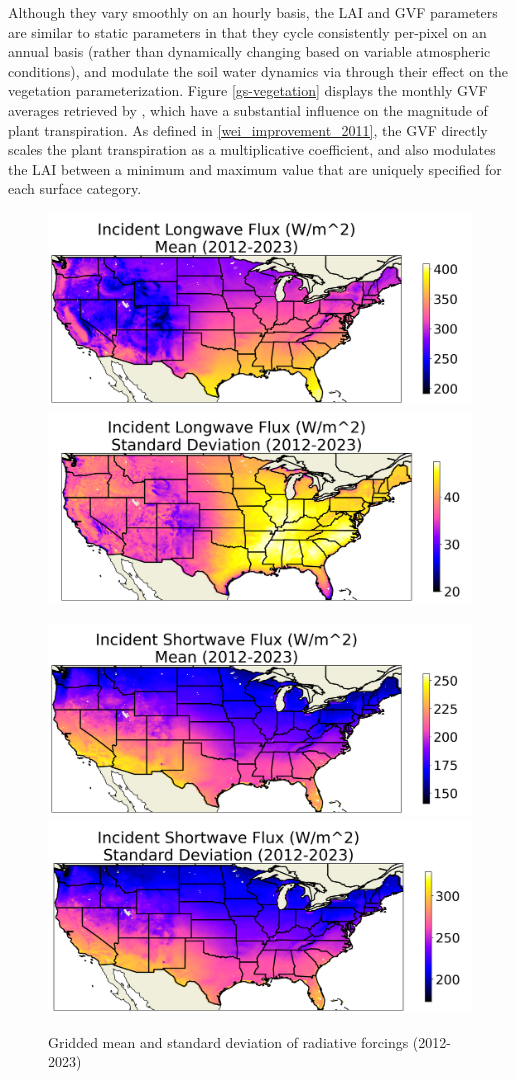 Although they vary smoothly on an hourly basis, the LAI and GVF parameters are similar to static parameters in that they cycle consistently per-pixel on an annual basis (rather than dynamically changing based on variable atmospheric conditions), and modulate the soil water dynamics via through their effect on the vegetation parameterization. Figure \ref{gs-vegetation} displays the monthly GVF averages retrieved by \citep{gutman_derivation_1998}, which have a substantial influence on the magnitude of plant transpiration. As defined in \ref{wei_improvement_2011}, the GVF directly scales the plant transpiration as a multiplicative coefficient, and also modulates the LAI between a minimum and maximum value that are uniquely specified for each surface category.

\begin{figure}[h!]
    \centering
    \includegraphics[width=.48\linewidth,draft=false]{figures/thesis-gridstats/gridstat-bulk_dlwrf_2012-1_2023-12_y000-195_x000-462_mean.png}
    \includegraphics[width=.48\linewidth,draft=false]{figures/thesis-gridstats/gridstat-bulk_dlwrf_2012-1_2023-12_y000-195_x000-462_stdev.png}

    \includegraphics[width=.48\linewidth,draft=false]{figures/thesis-gridstats/gridstat-bulk_dswrf_2012-1_2023-12_y000-195_x000-462_mean.png}
    \includegraphics[width=.48\linewidth,draft=false]{figures/thesis-gridstats/gridstat-bulk_dswrf_2012-1_2023-12_y000-195_x000-462_stdev.png}
    \caption{Gridded mean and standard deviation of radiative forcings (2012-2023)}
    \label{gs-radiative}
\end{figure}

